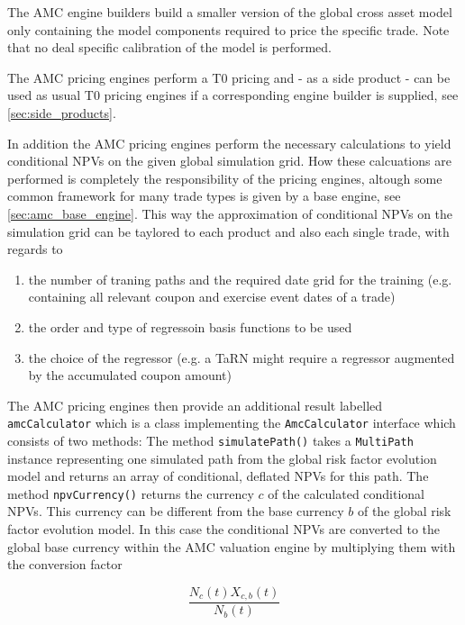 \documentclass[12pt, a4paper]{article}
\begin{document}
The AMC engine builders build a smaller version of the global cross asset model only containing the model components
required to price the specific trade. Note that no deal specific calibration of the model is performed.

The AMC pricing engines perform a T0 pricing and - as a side product - can be used as usual T0 pricing engines if a
corresponding engine builder is supplied, see \ref{sec:side_products}.

In addition the AMC pricing engines perform the necessary calculations to yield conditional NPVs on the given global
simulation grid. How these calcuations are performed is completely the responsibility of the pricing engines, altough
some common framework for many trade types is given by a base engine, see \ref{sec:amc_base_engine}. This way the
approximation of conditional NPVs on the simulation grid can be taylored to each product and also each single trade,
with regards to

\begin{enumerate}
\item the number of traning paths and the required date grid for the training (e.g. containing all relevant coupon and
  exercise event dates of a trade)
\item the order and type of regressoin basis functions to be used
\item the choice of the regressor (e.g. a TaRN might require a regressor augmented by the accumulated coupon amount)
\end{enumerate}

The AMC pricing engines then provide an additional result labelled \verb+amcCalculator+ which is a class implementing
the \verb+AmcCalculator+ interface which consists of two methods: The method \verb+simulatePath()+ takes a
\verb+MultiPath+ instance representing one simulated path from the global risk factor evolution model and returns an
array of conditional, deflated NPVs for this path. The method \verb+npvCurrency()+ returns the currency $c$ of the
calculated conditional NPVs. This currency can be different from the base currency $b$ of the global risk factor
evolution model. In this case the conditional NPVs are converted to the global base currency within the AMC valuation
engine by multiplying them with the conversion factor

\begin{equation}\label{currency_conversion_factor}
\frac{N_c(t) X_{c,b}(t)}{N_b(t)}
\end{equation}
\end{document}
